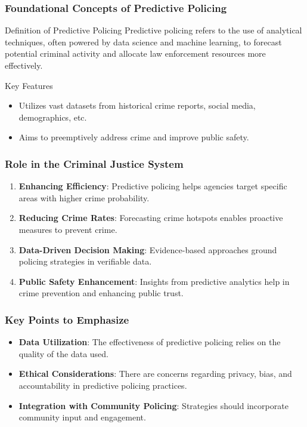 \documentclass[aspectratio=169]{beamer}
\begin{document}
\begin{frame}[fragile]
    \frametitle{Foundational Concepts of Predictive Policing}
    \begin{block}{Definition of Predictive Policing}
        Predictive policing refers to the use of analytical techniques, often powered by data science and machine learning, to forecast potential criminal activity and allocate law enforcement resources more effectively.
    \end{block}

    \begin{block}{Key Features}
        \begin{itemize}
            \item Utilizes vast datasets from historical crime reports, social media, demographics, etc.
            \item Aims to preemptively address crime and improve public safety.
        \end{itemize}
    \end{block}
\end{frame}

\begin{frame}[fragile]
    \frametitle{Role in the Criminal Justice System}
    \begin{enumerate}
        \item \textbf{Enhancing Efficiency}: 
            Predictive policing helps agencies target specific areas with higher crime probability.
        
        \item \textbf{Reducing Crime Rates}: 
            Forecasting crime hotspots enables proactive measures to prevent crime.
        
        \item \textbf{Data-Driven Decision Making}: 
            Evidence-based approaches ground policing strategies in verifiable data.
        
        \item \textbf{Public Safety Enhancement}: 
            Insights from predictive analytics help in crime prevention and enhancing public trust.
    \end{enumerate}
\end{frame}

\begin{frame}[fragile]
    \frametitle{Key Points to Emphasize}
    \begin{itemize}
        \item \textbf{Data Utilization}: 
            The effectiveness of predictive policing relies on the quality of the data used.
        
        \item \textbf{Ethical Considerations}: 
            There are concerns regarding privacy, bias, and accountability in predictive policing practices.

        \item \textbf{Integration with Community Policing}: 
            Strategies should incorporate community input and engagement.
    \end{itemize}
\end{frame}
\end{document}
